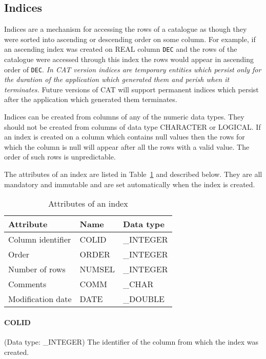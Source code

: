 \subsection{Indices}

Indices are a mechanism for accessing the rows of a catalogue as though
they were sorted into ascending or descending order on some column.  For
example, if an ascending index was created on REAL column {\tt DEC} and
the rows of the catalogue were accessed through this index the rows
would appear in ascending order of {\tt DEC}. {\it In CAT version
\CATversion indices are temporary entities which persist only for the
duration of the application which generated them and perish when it
terminates.} Future versions of CAT will support permanent indices which
persist after the application which generated them terminates.

Indices can be created from columns of any of the numeric data types.
They should not be created from columns of data type CHARACTER or
LOGICAL. If an index is created on a column which contains null values
then the rows for which the column is null will appear after all the
rows with a valid value. The order of such rows is unpredictable.

The attributes of an index are listed in Table~\ref{INDEX_ATT} and
described below. They are all mandatory and immutable and are set
automatically when the index is created.

\begin{table}[htbp]

\begin{center}
\begin{tabular}{lll}
Attribute         & Name    & Data type  \\ \hline
Column identifier & COLID   & \_INTEGER  \\
Order             & ORDER   & \_INTEGER  \\
Number of rows    & NUMSEL  & \_INTEGER  \\
Comments          & COMM    & \_CHAR     \\
Modification date & DATE    & \_DOUBLE   \\
\end{tabular}
\end{center}

\caption{\label{INDEX_ATT}Attributes of an index}

\end{table}

\paragraph{COLID}
(Data type: \_INTEGER)
The identifier of the column from which the index was created.

